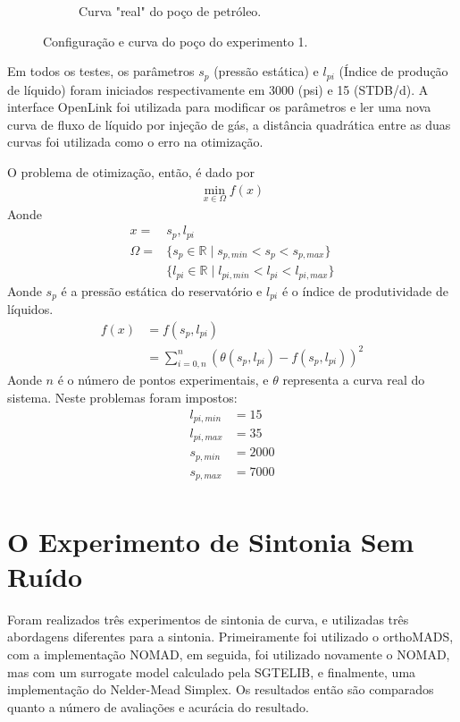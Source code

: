\begin{figure}[H]
\begin{subfigure}{.75\textwidth}
  \caption{Curva "real" do poço de petróleo.}
  \label{fig:truth1}
\end{subfigure}
\caption{Configuração e curva do poço do experimento 1.}
\label{fig:setup1}
\end{figure}

Em todos os testes, os parâmetros $s_p$ (pressão estática) e $l_{pi}$ (Índice de produção de líquido) foram iniciados respectivamente em 3000 (psi) e 15 (STDB/d). A interface OpenLink foi utilizada para modificar os parâmetros e ler uma nova curva de fluxo de líquido por injeção de gás, a distância quadrática entre as duas curvas foi utilizada como o erro na otimização.

O problema de otimização, então, é dado por 
\begin{align}
\min\limits_{x \in \Omega} f(x)
\end{align}
Aonde
\begin{align}
x = &s_p, l_{pi}\\
\Omega = &\{s_p \in \mathbb{R} \mid s_{p,min} < s_p < s_{p,max}\}\\
          &\{l_{pi} \in \mathbb{R} \mid  l_{pi,min} < l_{pi} < l_{pi,max}\}
\end{align}
Aonde $s_p$ é a pressão estática do reservatório e $l_{pi}$ é o índice de produtividade de líquidos.
\begin{align}
f(x) &= f(s_p, l_{pi}) \\
     &= \sum_{i=0,n}^n (\theta(s_p,l_{pi}) - f(s_p,l_{pi}))^2
\end{align}
Aonde $n$ é o número de pontos experimentais, e $\theta$ representa a curva real do sistema. Neste problemas foram impostos: 
\begin{align*}
l_{pi,min}&= 15\\
l_{pi,max}&= 35\\
s_{p,min} &= 2000\\
s_{p,max} &= 7000\\
\end{align*}
\chapter{O Experimento de Sintonia Sem Ruído}

Foram realizados três experimentos de sintonia de curva, e utilizadas três abordagens diferentes para a sintonia. Primeiramente foi utilizado o orthoMADS, com a implementação NOMAD, em seguida, foi utilizado novamente o NOMAD, mas com um surrogate model calculado pela SGTELIB, e finalmente, uma implementação do Nelder-Mead Simplex. Os resultados então são comparados quanto a número de avaliações e acurácia do resultado.

